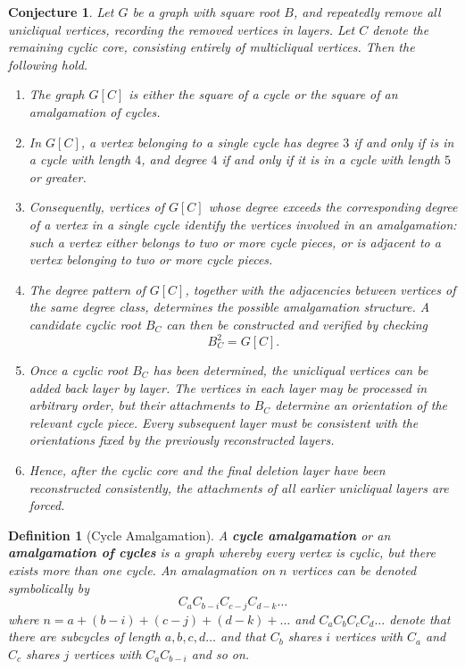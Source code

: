 \documentclass[11pt]{article}
\newtheorem{conjecture}{Conjecture}
\newtheorem{definition}{Definition}[section]
\begin{document}
\begin{conjecture}
  Let $G$ be a graph with square root $B$, and repeatedly remove all unicliqual vertices, recording the removed vertices in layers. Let $C$ denote the remaining cyclic core, consisting entirely of multicliqual vertices. Then the following hold.

  \begin{enumerate}[label=\roman*)]
    \item The graph $G[C]$ is either the square of a cycle or the square of an amalgamation of cycles.

    \item In $G[C]$, a vertex belonging to a single cycle has degree $3$ if and only if is in a cycle with length $4$, and degree $4$ if and only if it is in a cycle with length $5$ or greater.

    \item Consequently, vertices of $G[C]$ whose degree exceeds the corresponding degree of a vertex in a single cycle identify the vertices involved in an amalgamation: such a vertex either belongs to two or more cycle pieces, or is adjacent to a vertex belonging to two or more cycle pieces.

    \item The degree pattern of $G[C]$, together with the adjacencies between vertices of the same degree class, determines the possible amalgamation structure. A candidate cyclic root $B_C$ can then be constructed and verified by checking
    \[
    B_C^2=G[C].
    \]

    \item Once a cyclic root $B_C$ has been determined, the unicliqual vertices can be added back layer by layer. The vertices in each layer may be processed in arbitrary order, but their attachments to $B_C$ determine an orientation of the relevant cycle piece. Every subsequent layer must be consistent with the orientations fixed by the previously reconstructed layers.

    \item Hence, after the cyclic core and the final deletion layer have been reconstructed consistently, the attachments of all earlier unicliqual layers are forced.
  \end{enumerate}
\end{conjecture}

\begin{definition}[Cycle Amalgamation] \label{def::cycle_amalgamation}
  A \textbf{cycle amalgamation} or an \textbf{amalgamation of cycles} is a graph whereby every vertex is cyclic, but there exists more than one cycle. An amalagmation on $n$ vertices can be denoted symbolically by
  \[
  C_aC_{b-i}C_{c-j}C_{d-k} \ldots
  \]
  where $n = a + (b - i) + (c - j) + (d - k) + \ldots $ and $C_aC_bC_cC_d \ldots$ denote that there are subcycles of length $a,b,c,d \ldots$ and that $C_b$ shares $i$ vertices with $C_a$ and $C_c$ shares $j$ vertices with $C_aC_{b-i}$ and so on. 
\end{definition}
\end{document}
